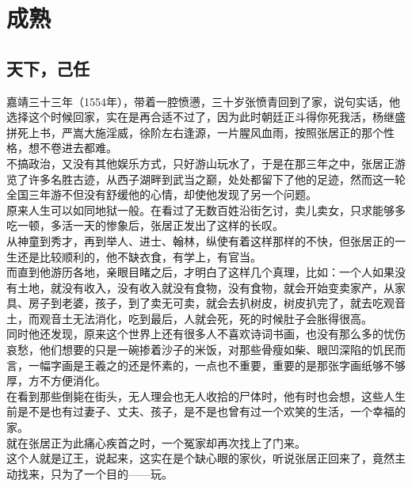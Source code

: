 \section{成熟}
\ifnum{}
	\begin{multicols}{\theparacolNo}
\fi
\subsection{天下，己任}
嘉靖三十三年（1554年），带着一腔愤懑，三十岁张愤青回到了家，说句实话，他选择这个时候回家，实在是再合适不过了，因为此时朝廷正斗得你死我活，杨继盛拼死上书，严嵩大施淫威，徐阶左右逢源，一片腥风血雨，按照张居正的那个性格，想不卷进去都难。\\

不搞政治，又没有其他娱乐方式，只好游山玩水了，于是在那三年之中，张居正游览了许多名胜古迹，从西子湖畔到武当之巅，处处都留下了他的足迹，然而这一轮全国三年游不但没有舒缓他的心情，却使他发现了另一个问题。\\

原来人生可以如同地狱一般。在看过了无数百姓沿街乞讨，卖儿卖女，只求能够多吃一顿，多活一天的惨象后，张居正发出了这样的长叹。\\

从神童到秀才，再到举人、进士、翰林，纵使有着这样那样的不快，但张居正的一生还是比较顺利的，他不缺衣食，有学上，有官当。\\

而直到他游历各地，亲眼目睹之后，才明白了这样几个真理，比如：一个人如果没有土地，就没有收入，没有收入就没有食物，没有食物，就会开始变卖家产，从家具、房子到老婆，孩子，到了卖无可卖，就会去扒树皮，树皮扒完了，就去吃观音土，而观音土无法消化，吃到最后，人就会死，死的时候肚子会胀得很高。\\

同时他还发现，原来这个世界上还有很多人不喜欢诗词书画，也没有那么多的忧伤哀愁，他们想要的只是一碗掺着沙子的米饭，对那些骨瘦如柴、眼凹深陷的饥民而言，一幅字画是王羲之的还是怀素的，一点也不重要，重要的是那张字画纸够不够厚，方不方便消化。\\

在看到那些倒毙在街头，无人理会也无人收拾的尸体时，他有时也会想，这些人生前是不是也有过妻子、丈夫、孩子，是不是也曾有过一个欢笑的生活，一个幸福的家。\\

就在张居正为此痛心疾首之时，一个冤家却再次找上了门来。\\

这个人就是辽王，说起来，这实在是个缺心眼的家伙，听说张居正回来了，竟然主动找来，只为了一个目的——玩。\\


\end{multicols}
